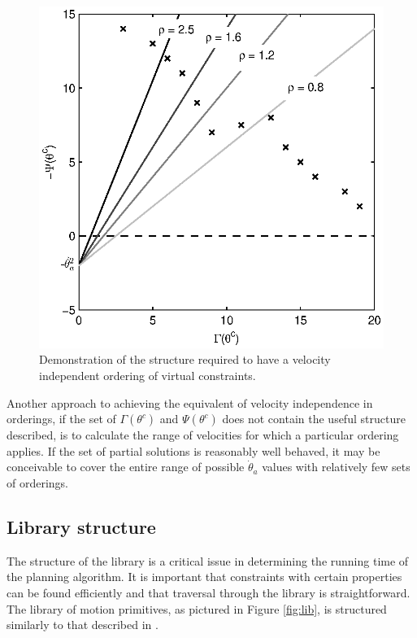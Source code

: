 \begin{figure}
\centering
\includegraphics[width=0.6\linewidth]{4VirtConstLib/totord}
\caption[Velocity independent ordering of virtual constraints]{Demonstration of the structure required to have a velocity independent ordering of virtual constraints.}
\label{fig:totord}
\end{figure}

Another approach to achieving the equivalent of velocity independence in orderings, if the set of $\Gamma(\theta^c)$ and $\Psi(\theta^c)$ does not contain the useful structure described, is to calculate the range of velocities for which a particular ordering applies. If the set of partial solutions is reasonably well behaved, it may be conceivable to cover the entire range of possible $\dot{\theta}_a$ values with relatively few sets of orderings.

\subsection{Library structure}
The structure of the library is a critical issue in determining the running time of the planning algorithm. It is important that constraints with certain properties can be found efficiently and that traversal through the library is straightforward. The library of motion primitives, as pictured in Figure \ref{fig:lib}, is structured similarly to that described in \cite{manchester13planning}.


